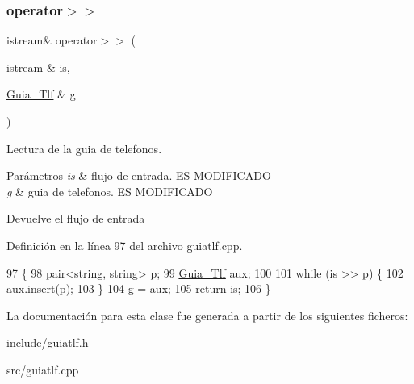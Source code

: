\subsubsection{\texorpdfstring{operator$>$$>$}{operator>>}}
{\footnotesize\ttfamily istream\& operator$>$$>$ (\begin{DoxyParamCaption}\item[{istream \&}]{is,  }\item[{\hyperlink{classGuia__Tlf}{Guia\+\_\+\+Tlf} \&}]{g }\end{DoxyParamCaption})\hspace{0.3cm}{\ttfamily [friend]}}



Lectura de la guia de telefonos. 


\begin{DoxyParams}{Parámetros}
{\em is} & flujo de entrada. ES M\+O\+D\+I\+F\+I\+C\+A\+DO \\
\hline
{\em g} & guia de telefonos. ES M\+O\+D\+I\+F\+I\+C\+A\+DO \\
\hline
\end{DoxyParams}
\begin{DoxyReturn}{Devuelve}
el flujo de entrada 
\end{DoxyReturn}


Definición en la línea 97 del archivo guiatlf.\+cpp.


\begin{DoxyCode}
97                                                  \{
98         pair<string, string> p;
99         \hyperlink{classGuia__Tlf}{Guia\_Tlf} aux;
100 
101         \textcolor{keywordflow}{while} (is >> p) \{
102             aux.\hyperlink{classGuia__Tlf_add78a6fe5e8090ad6f71bbb160b70f77}{insert}(p);
103         \}
104         g = aux;
105         \textcolor{keywordflow}{return} is;
106     \}
\end{DoxyCode}


La documentación para esta clase fue generada a partir de los siguientes ficheros\+:\begin{DoxyCompactItemize}
\item 
include/guiatlf.\+h\item 
src/guiatlf.\+cpp\end{DoxyCompactItemize}
